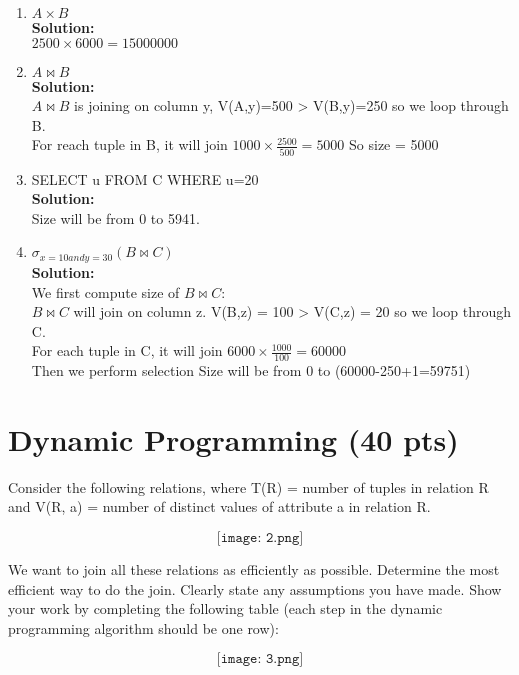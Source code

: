 \documentclass[paper=a4, fontsize=11pt]{scrartcl}
\numberwithin{equation}{section}		%
\numberwithin{figure}{section}			%
\numberwithin{table}{section}				%
\begin{document}
	\begin{enumerate}
		\item $A \times B$\\
		\textbf{Solution: }\\
		$2500 \times 6000 = 15000000$
		
		\item $A \bowtie B$\\
		\textbf{Solution: }\\
		$A \bowtie B$ is joining on column y, V(A,y)=500 > V(B,y)=250 so we loop through B.\\
		For reach tuple in B, it will join $1000 \times \frac{2500}{500} = 5000$
		So size = 5000
		
		\item SELECT u FROM C WHERE u=20\\
		\textbf{Solution: }\\
		Size will be from 0 to 5941.
		
		\item $\sigma_{x = 10 and y=30}(B \bowtie C)$\\
		\textbf{Solution: }\\
		We first compute size of $B \bowtie C$:\\
		$B \bowtie C$ will join on column z. V(B,z) = 100 > V(C,z) = 20 so we loop through C.\\
		For each tuple in C, it will join $6000 \times \frac{1000}{100} = 60000$\\
		Then we perform selection
		Size will be from 0 to (60000-250+1=59751)
		
		
	\end{enumerate}
	
	
	\section{Dynamic Programming (40 pts)}
	
	Consider the following relations, where T(R) = number of tuples in relation R and V(R, a) = number of distinct values of attribute a in relation R.
	
	\[
	\texttt{[image: 2.png]}
	\]
	
	We want to join all these relations as efficiently as possible. Determine the most efficient way to do the join. Clearly state any assumptions you have made. Show your work by completing the following table (each step in the dynamic programming algorithm should be one row):
	
	\[
	\texttt{[image: 3.png]}
	\]
	
\end{document}
